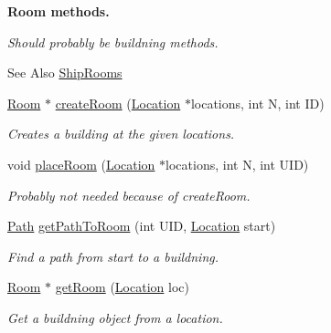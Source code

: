 \begin{Indent}{\bf Room methods.}\par
{\em Should probably be buildning methods. \begin{DoxySeeAlso}{See Also}
\hyperlink{classShipRooms}{Ship\-Rooms} 
\end{DoxySeeAlso}
}\begin{DoxyCompactItemize}
\item 
\hyperlink{classRoom}{Room} $\ast$ \hyperlink{classShipMaster_a8e920cb8c50c68d858d2d90d9b8b377a}{create\-Room} (\hyperlink{structLocation}{Location} $\ast$locations, int N, int I\-D)
\begin{DoxyCompactList}\small\item\em Creates a building at the given locations. \end{DoxyCompactList}\item 
void \hyperlink{classShipMaster_aceb6ebe9dc8112ad8bcec3598b83b0e9}{place\-Room} (\hyperlink{structLocation}{Location} $\ast$locations, int N, int U\-I\-D)
\begin{DoxyCompactList}\small\item\em Probably not needed because of create\-Room. \end{DoxyCompactList}\item 
\hyperlink{classPath}{Path} \hyperlink{classShipMaster_acd0cd7045dc4852607f50c13b3780a94}{get\-Path\-To\-Room} (int U\-I\-D, \hyperlink{structLocation}{Location} start)
\begin{DoxyCompactList}\small\item\em Find a path from start to a buildning. \end{DoxyCompactList}\item 
\hyperlink{classRoom}{Room} $\ast$ \hyperlink{classShipMaster_a2418804a9b994f7a3c18b8d2edc77aed}{get\-Room} (\hyperlink{structLocation}{Location} loc)
\begin{DoxyCompactList}\small\item\em Get a buildning object from a location. \end{DoxyCompactList}\end{DoxyCompactItemize}
\end{Indent}
